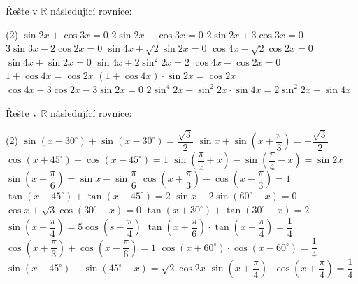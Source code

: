 \documentclass[12pt,a4paper]{article}
\begin{document}
\begin{exercise}
    Řešte v $\mathbb{R}$ následující rovnice:
    \begin{tasks}(2)
        \task $\sin 2x + \cos 3x = 0$
        \task $2 \sin 2x - \cos 3x = 0$
        \task $2 \sin 2x + 3 \cos 3x = 0$
        \task $3 \sin 3x - 2 \cos 2x = 0$
        \task $\sin 4x + \sqrt{2} \sin 2x = 0$
        \task $\cos 4x - \sqrt{2} \cos 2x = 0$
        \task $\sin 4x + \sin 2x = 0$
        \task $\sin 4x + 2 \sin^2 2x = 2$
        \task $\cos 4x - \cos 2x = 0$
        \task $1 + \cos 4x = \cos 2x$
        \task $\left(1 + \cos 4x\right) \cdot \sin 2x = \cos 2x$
        \task $\cos 4x - 3 \cos 2x - 3 \sin 2x = 0$
        \task $\text{$2 \sin^4 2x - \sin^2 2x \cdot \sin 4x = 2 \sin^2 2x - \sin 4x$}$
    \end{tasks}
\end{exercise}


\begin{exercise}
    Řešte v $\mathbb{R}$ následující rovnice:
    \begin{tasks}(2)
        \task $\sin \left(x + 30^\circ\right) + \sin \left(x - 30^\circ\right) = \dfrac{\sqrt{3}}{2}$
        \task $\sin x + \sin\left(x + \dfrac{\pi}{3}\right) = - \dfrac{\sqrt{3}}{2}$
        \task $\cos \left(x + 45^\circ\right) + \cos \left(x - 45^\circ\right) = 1$
        \task $\sin \left(\dfrac{\pi}{x} + x\right) - \sin \left(\dfrac{\pi}{4} - x\right) = \sin 2x$
        \task $\sin \left(x - \dfrac{\pi}{6}\right) = \sin x - \sin \dfrac{\pi}{6}$
        \task $\cos \left(x + \dfrac{\pi}{3}\right) - \cos \left(x - \dfrac{\pi}{3}\right) = 1$
        \task $\tan \left(x + 45^\circ\right) + \tan \left(x - 45^\circ\right) = 2$
        \task {}
        \task {}
        \task $\sin x - 2 \sin \left(60^\circ - x\right) = 0$
        \task $\cos x + \sqrt{3} \cos \left(30^\circ + x\right) = 0$
        \task $\tan \left(x + 30^\circ\right) + \tan \left(30^\circ - x\right) = 2$
        \task $\sin \left(x + \dfrac{\pi}{4}\right) = 5 \cos \left(s - \dfrac{\pi}{4}\right)$
        \task $\tan \left(x + \dfrac{\pi}{6}\right) \cdot \tan \left(x - \dfrac{\pi}{4}\right) = \dfrac{1}{4}$
        \task $\cos \left(x + \dfrac{\pi}{3}\right) + \cos \left(x - \dfrac{\pi}{6}\right) = 1$
        \task $\cos \left(x + 60^\circ\right) \cdot \cos \left(x - 60^\circ\right) = \dfrac{1}{4}$
        \task $\sin \left(x + 45^\circ\right) - \sin \left(45^\circ - x\right) = \sqrt{2} \cos 2x$
        \task $\sin \left(x + \dfrac{\pi}{4}\right) \cdot \cos \left(x + \dfrac{\pi}{4}\right) = \dfrac{1}{4}$
    \end{tasks}
\end{exercise}
\end{document}
